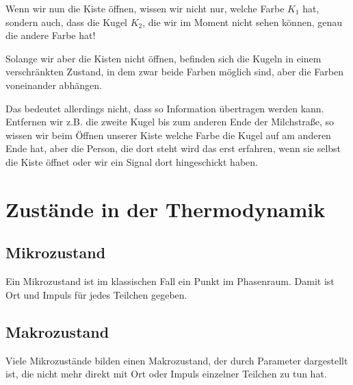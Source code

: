 \documentclass[ngerman]{scrartcl}
\begin{document}
	Wenn wir nun die Kiste öffnen, wissen wir nicht nur, welche Farbe $K_1$ hat, sondern auch, dass die Kugel $K_2$, die wir im Moment nicht sehen können, genau die andere Farbe hat! 
	
	Solange wir aber die Kisten nicht öffnen, befinden sich die Kugeln in einem verschränkten Zustand, in dem zwar beide Farben möglich sind, aber die Farben voneinander abhängen. 
	
	Das bedeutet allerdings nicht, dass so Information übertragen werden kann. Entfernen wir z.B. die zweite Kugel bis zum anderen Ende der Milchstraße, so wissen wir beim Öffnen unserer Kiste welche Farbe die Kugel auf am anderen Ende hat, aber die Person, die dort steht wird das erst erfahren, wenn sie selbst die Kiste öffnet oder wir ein Signal dort hingeschickt haben.

\section{Zustände in der Thermodynamik}

\subsection*{Mikrozustand}
Ein Mikrozustand ist im klassischen Fall ein Punkt im Phasenraum. Damit ist Ort und Impuls für jedes Teilchen gegeben.

\subsection*{Makrozustand}
Viele Mikrozustände bilden einen Makrozustand, der durch Parameter dargestellt ist, die nicht mehr direkt mit Ort oder Impuls einzelner Teilchen zu tun hat. 


\newpage
\printbibliography
\end{document}

